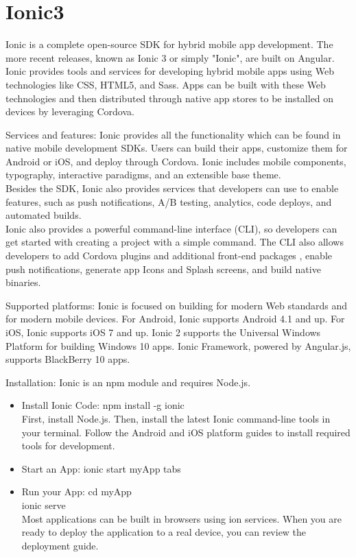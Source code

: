 \section{Ionic3}
Ionic is a complete open-source SDK for hybrid mobile app development. The more recent releases, known as Ionic 3 or simply "Ionic", are built on Angular. Ionic provides tools and services for developing hybrid mobile apps using Web technologies like CSS, HTML5, and Sass. Apps can be built with these Web technologies and then distributed through native app stores to be installed on devices by leveraging Cordova.
\item Services and features: Ionic provides all the functionality which can be found in native mobile development SDKs. Users can build their apps, customize them for Android or iOS, and deploy through Cordova. Ionic includes mobile components, typography, interactive paradigms, and an extensible base theme. \\ Besides the SDK, Ionic also provides services that developers can use to enable features, such as push notifications, A/B testing, analytics, code deploys, and automated builds. \\ Ionic also provides a powerful command-line interface (CLI), so developers can get started with creating a project with a simple command. The CLI also allows developers to add Cordova plugins and additional front-end packages \cite{7}, enable push notifications, generate app Icons and Splash screens, and build native binaries. \\
\item Supported platforms: Ionic is focused on building for modern Web standards and for modern mobile devices. For Android, Ionic supports Android 4.1 and up. For iOS, Ionic supports iOS 7 and up. Ionic 2 supports the Universal Windows Platform for building Windows 10 apps. Ionic Framework, powered by Angular.js, supports BlackBerry 10 apps. \\
\item Installation: Ionic is an npm module and requires Node.js.
\begin{itemize}
\\ \item Install Ionic Code: npm install -g ionic \\ First, install Node.js. Then, install the latest Ionic command-line tools in your terminal. Follow the Android and iOS platform guides to install required tools for development. \\ 
\item Start an App: ionic start myApp tabs
\item Run your App: cd myApp \\ ionic serve \\ Most applications can be built in browsers using ion services. When you are ready to deploy the application to a real device, you can review the deployment guide.
\end{itemize}
